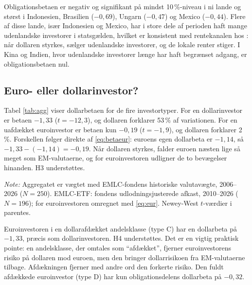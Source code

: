 \documentclass[11pt,a4paper]{article}
\begin{document}
Obligationsbetaen er negativ og signifikant på mindst 10\,\%-niveau i ni lande og størst i Indonesien, Brasilien ($-0{,}69$), Ungarn ($-0{,}47$) og Mexico ($-0{,}44$). Flere af disse lande, især Indonesien og Mexico, har i store dele af perioden haft mange udenlandske investorer i statsgælden, hvilket er konsistent med rentekanalen hos \citet{hofmann2020}: når dollaren styrkes, sælger udenlandske investorer, og de lokale renter stiger. I Kina og Indien, hvor udenlandske investorer længe har haft begrænset adgang, er obligationsbetaen nul.

\subsection{Euro- eller dollarinvestor?}
Tabel \ref{tab:agg} viser dollarbetaen for de fire investortyper. For en dollarinvestor er betaen $-1{,}33$ ($t=-12{,}3$), og dollaren forklarer 53\,\% af variationen. For en uafdækket euroinvestor er betaen kun $-0{,}19$ ($t=-1{,}9$), og dollaren forklarer 2\,\%. Forskellen følger direkte af \eqref{eq:betaeur}: euroens egen dollarbeta er $-1{,}14$, så $-1{,}33 - (-1{,}14) = -0{,}19$. Når dollaren styrkes, falder euroen næsten lige så meget som EM-valutaerne, og for euroinvestoren udligner de to bevægelser hinanden. H3 understøttes.

\begin{table}[htbp]
\centering
\begin{threeparttable}
\caption{Dollarbeta for fire investortyper, vægtet aggregat og EMLC}
\label{tab:agg}
\small

\begin{tablenotes}\footnotesize
\item \emph{Note:} Aggregatet er vægtet med EMLC-fondens historiske valutavægte, 2006--2026 ($N=250$). EMLC-ETF: fondens udlodningsjusterede afkast, 2010--2026 ($N=196$); for euroinvestoren omregnet med \eqref{eq:eur}. Newey-West $t$-værdier i parentes.
\end{tablenotes}
\end{threeparttable}
\end{table}

Euroinvestoren i en dollarafdækket andelsklasse (type C) har en dollarbeta på $-1{,}33$, præcis som dollarinvestoren. H4 understøttes. Det er en vigtig praktisk pointe: en andelsklasse, der omtales som ``afdækket'', fjerner euroinvestorens risiko på dollaren mod euroen, men den bringer dollarrisikoen fra EM-valutaerne tilbage. Afdækningen fjerner med andre ord den forkerte risiko. Den fuldt afdækkede euroinvestor (type D) har kun obligationsdelens dollarbeta på $-0{,}32$.
\end{document}
